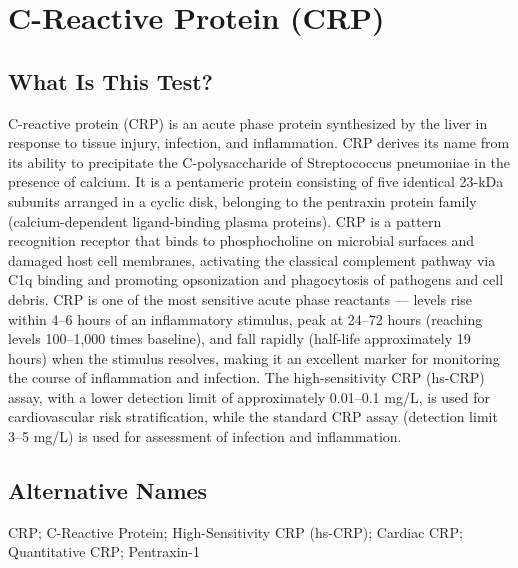 \chapter{C-Reactive Protein (CRP)}

\section*{What Is This Test?}
C-reactive protein (CRP) is an acute phase protein synthesized by the liver in response to tissue injury, infection, and inflammation. CRP derives its name from its ability to precipitate the C-polysaccharide of Streptococcus pneumoniae in the presence of calcium. It is a pentameric protein consisting of five identical 23-kDa subunits arranged in a cyclic disk, belonging to the pentraxin protein family (calcium-dependent ligand-binding plasma proteins). CRP is a pattern recognition receptor that binds to phosphocholine on microbial surfaces and damaged host cell membranes, activating the classical complement pathway via C1q binding and promoting opsonization and phagocytosis of pathogens and cell debris. CRP is one of the most sensitive acute phase reactants --- levels rise within 4--6 hours of an inflammatory stimulus, peak at 24--72 hours (reaching levels 100--1,000 times baseline), and fall rapidly (half-life approximately 19 hours) when the stimulus resolves, making it an excellent marker for monitoring the course of inflammation and infection. The high-sensitivity CRP (hs-CRP) assay, with a lower detection limit of approximately 0.01--0.1 mg/L, is used for cardiovascular risk stratification, while the standard CRP assay (detection limit 3--5 mg/L) is used for assessment of infection and inflammation.

\section*{Alternative Names}
CRP; C-Reactive Protein; High-Sensitivity CRP (hs-CRP); Cardiac CRP; Quantitative CRP; Pentraxin-1

